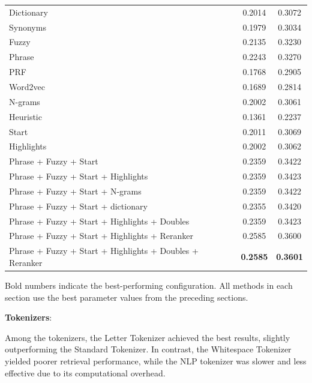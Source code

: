 \begin{table}[ht]
\begin{tabular}{|l|c|c|}
Dictionary                                          & 0.2014 & 0.3072 \\
Synonyms                                            & 0.1979 & 0.3034 \\
Fuzzy                                               & 0.2135 & 0.3230 \\
Phrase                                              & 0.2243 & 0.3270 \\
PRF                                                 & 0.1768 & 0.2905 \\
Word2vec                                            & 0.1689 & 0.2814 \\
N-grams                                             & 0.2002 & 0.3061 \\
Heuristic                                           & 0.1361 & 0.2237 \\
Start                                               & 0.2011 & 0.3069 \\
Highlights                                          & 0.2002 & 0.3062 \\
Phrase + Fuzzy + Start                              & 0.2359 & 0.3422 \\
Phrase + Fuzzy + Start + Highlights                 & 0.2359 & 0.3423 \\
Phrase + Fuzzy + Start + N-grams                    & 0.2359 & 0.3422 \\
Phrase + Fuzzy + Start + dictionary                 & 0.2355 & 0.3420 \\
Phrase + Fuzzy + Start + Highlights + Doubles       & 0.2359 & 0.3423 \\
Phrase + Fuzzy + Start + Highlights + Reranker      & 0.2585 & 0.3600 \\
Phrase + Fuzzy + Start + Highlights + Doubles + Reranker      & \textbf{0.2585} & \textbf{0.3601} \\
\hline
\end{tabular}
\begin{tablenotes}
\footnotesize
\item Bold numbers indicate the best-performing configuration. All methods in each section use the best parameter values from the preceding sections.
\end{tablenotes}
\end{table}


\textbf{Tokenizers}:

Among the tokenizers, the Letter Tokenizer achieved the best results, slightly outperforming the Standard Tokenizer. In contrast, the Whitespace Tokenizer yielded poorer retrieval performance, while the NLP tokenizer was slower and less effective due to its computational overhead.

